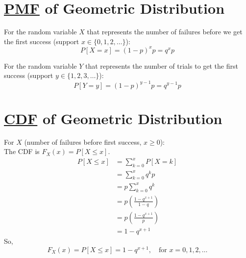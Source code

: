 \section{\href{def:probability-mass-function}{PMF} of Geometric Distribution}
\label{sec:pmf-of-geometric-distribution}
For the random variable \(X\) that represents the number of failures before we get
the first success (support \(x \in \{0, 1, 2, \dots\}\)):
\begin{equation}
  \label{eqn:pmf-geometric-X}
  \boxed{P[X=x] = (1-p)^{x}p = q^{x}p}
\end{equation}

For the random variable \(Y\) that represents the number of trials to get the first success (support \(y \in \{1, 2, 3, \dots\}\)):
\begin{equation}
  \label{eqn:pmf-geometric-Y}
  \boxed{P[Y=y] = (1-p)^{y-1}p = q^{y-1}p}
\end{equation}

\section{\href{def:cumulative-distribution-function}{CDF} of Geometric
Distribution}
\label{sec:cdf-of-geometric-distribution}

For \(X\) (number of failures before first success, \(x \ge 0\)):\\
The CDF is \(F_X(x) = P[X \le x]\).
\begin{align*}
  P[X \le x] &= \sum_{k=0}^{x} P[X=k] \\
             &= \sum_{k=0}^{x} q^k p \\
             &= p \sum_{k=0}^{x} q^k \\
             &= p \left( \frac{1-q^{x+1}}{1-q} \right) \\
             &= p \left( \frac{1-q^{x+1}}{p} \right) \\
             &= 1 - q^{x+1}
\end{align*}
So,
\begin{equation}
  \label{eqn:cdf-geometric-X}
  \boxed{F_X(x) = P[X \le x] = 1 - q^{x+1}, \quad \text{for } x = 0, 1, 2, \dots}
\end{equation}

